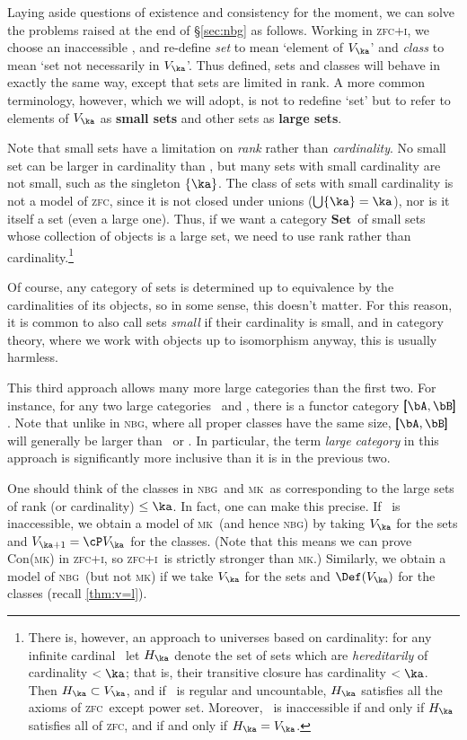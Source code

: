 \documentclass{amsart}
\newcommand{\Set}{\ensuremath{\mathbf{Set}}}
\def\zfc{\textsc{zfc}}
\def\zfci{\textsc{zfc+i}}
\def\nbg{\textsc{nbg}}
\def\mk{\textsc{mk}}
\begin{document}
Laying aside questions of existence and consistency for the moment, we
can solve the problems raised at the end of \S\ref{sec:nbg} as
follows.  Working in \zfci, we choose an inaccessible \ka, and
re-define \emph{set} to mean `element of $V_\ka$' and \emph{class} to
mean `set not necessarily in $V_\ka$'.  Thus defined, sets and classes
will behave in exactly the same way, except that sets are limited in
rank.  A more common terminology, however, which we will adopt, is not
to redefine `set' but to refer to elements of $V_\ka$ as \textbf{small
  sets} and other sets as \textbf{large sets}.

Note that small sets have a limitation on \emph{rank} rather than
\emph{cardinality}.  No small set can be larger in cardinality than
\ka, but many sets with small cardinality are not small, such as the
singleton $\{\ka\}$.  The class of sets with small cardinality is not
a model of \zfc, since it is not closed under unions ($\bigcup \{\ka\}
= \ka$), nor is it itself a set (even a large one).  Thus, if we want
a category \Set\ of small sets whose collection of objects is a large
set, we need to use rank rather than cardinality.\footnote{There is,
  however, an approach to universes based on cardinality: for any
  infinite cardinal \ka\ let $H_\ka$ denote the set of sets which are
  \emph{hereditarily} of cardinality $<\ka$; that is, their transitive
  closure has cardinality $<\ka$.  Then $H_\ka\subset V_\ka$, and if
  \ka\ is regular and uncountable, $H_\ka$ satisfies all the axioms of
  \zfc\ except power set.  Moreover, \ka\ is inaccessible if and only
  if $H_\ka$ satisfies all of \zfc, and if and only if $H_\ka=V_\ka$.}

Of course, any category of sets is determined up to equivalence by the
cardinalities of its objects, so in some sense, this doesn't matter.
For this reason, it is common to also call sets \emph{small} if their
cardinality is small, and in category theory, where we work with
objects up to isomorphism anyway, this is usually harmless.

This third approach allows many more large categories than the first
two.  For instance, for any two large categories \bA\ and \bB, there
is a functor category $\pmb[\bA,\bB\pmb]$.  Note that unlike in \nbg,
where all proper classes have the same size, $\pmb[\bA,\bB\pmb]$ will
generally be larger than \bA\ or \bB.  In particular, the term
\emph{large category} in this approach is significantly more inclusive
than it is in the previous two.

One should think of the classes in \nbg\ and \mk\ as corresponding to
the large sets of rank (or cardinality) $\le \ka$.  In fact, one can
make this precise.  If \ka\ is inaccessible, we obtain a model of \mk\
(and hence \nbg) by taking $V_\ka$ for the sets and $V_{\ka+1} = \cP
V_\ka$ for the classes.  (Note that this means we can prove Con(\mk)
in \zfci, so \zfci\ is strictly stronger than \mk.)  Similarly, we
obtain a model of \nbg\ (but not \mk) if we take $V_\ka$ for the sets
and $\Def(V_{\ka})$ for the classes (recall \autoref{thm:v=l}).
\end{document}
